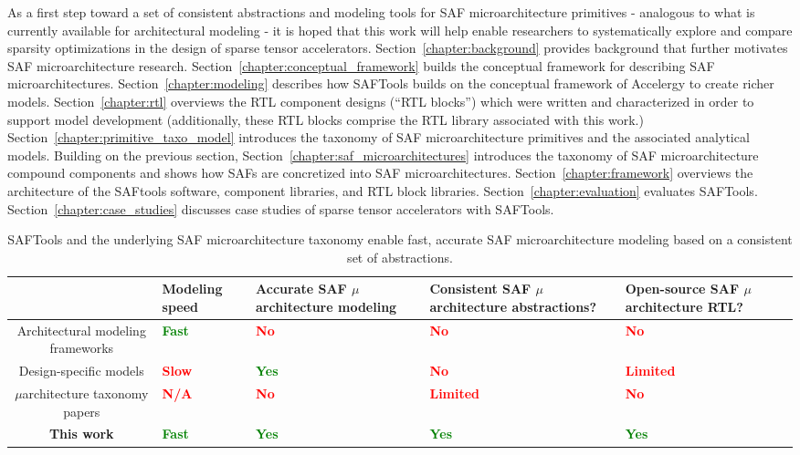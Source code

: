 As a first step toward a set of consistent abstractions and modeling tools for SAF microarchitecture primitives - analogous to what is currently available for architectural modeling - it is hoped that this work will help enable researchers to systematically explore and compare sparsity optimizations in the design of sparse tensor accelerators. Section~\ref{chapter:background} provides background that further motivates SAF microarchitecture research. Section~\ref{chapter:conceptual_framework} builds the conceptual framework for describing SAF microarchitectures. Section~\ref{chapter:modeling} describes how SAFTools builds on the conceptual framework of Accelergy to create richer models. Section~\ref{chapter:rtl} overviews the RTL component designs (``RTL blocks'') which were written and characterized in order to support model development (additionally, these RTL blocks comprise the RTL library associated with this work.) Section~\ref{chapter:primitive_taxo_model} introduces the taxonomy of SAF microarchitecture primitives and the associated analytical models. Building on the previous section, Section~\ref{chapter:saf_microarchitectures} introduces the taxonomy of SAF microarchitecture compound components and shows how SAFs are concretized into SAF microarchitectures. Section~\ref{chapter:framework} overviews the architecture of the SAFtools software, component libraries, and RTL block libraries. Section~\ref{chapter:evaluation} evaluates SAFTools. Section~\ref{chapter:case_studies} discusses case studies of sparse tensor accelerators with SAFTools.

\begin{table*}[ht]
\begin{tabular}{c|p{2.5cm}|p{2.5cm}|p{2.5cm}|p{2.5cm}}
 & Modeling speed & Accurate SAF $\mu$architecture modeling & Consistent SAF $\mu$architecture abstractions? & Open-source SAF $\mu$architecture RTL?\\ \hline \hline
Architectural modeling frameworks & \textcolor{green}{\textbf{Fast}} & \textcolor{red}{\textbf{No}} & \textcolor{red}{\textbf{No}} & \textcolor{red}{\textbf{No}} \\ \hline
Design-specific models & \textcolor{red}{\textbf{Slow}} & \textcolor{green}{\textbf{Yes}} & \textcolor{red}{\textbf{No}} & \textcolor{red}{\textbf{Limited}} \\ \hline
$\mu$architecture taxonomy papers & \textcolor{red}{\textbf{N/A}} & \textcolor{red}{\textbf{No}} & \textcolor{red}{\textbf{Limited}} & \textcolor{red}{\textbf{No}} \\ \hline
\textbf{This work} & \textcolor{green}{\textbf{Fast}} & \textcolor{green}{\textbf{Yes}} & \textcolor{green}{\textbf{Yes}} & \textcolor{green}{\textbf{Yes}} \\ \hline
\end{tabular}
\label{tab:thiswork}
\caption{SAFTools and the underlying SAF microarchitecture taxonomy enable fast, accurate SAF microarchitecture modeling based on a consistent set of abstractions.}
\centering
\end{table*}